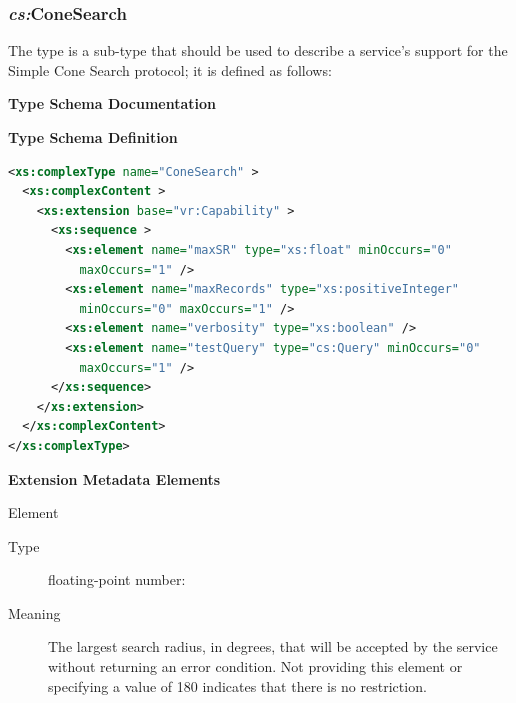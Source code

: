 \documentclass[11pt,a4paper]{ivoa}
\begin{document}
\subsubsection{\textit{cs:}ConeSearch}
\label{subsec:cstype}
The  type is a  sub-type that should be used
to describe a service's support for the Simple Cone Search protocol;
it is defined as follows:

\begin{generated}
\begingroup
      	\renewcommand*\descriptionlabel[1]{%
      	\hbox to 5.5em{\emph{#1}\hfil}}\vspace{2ex}\noindent\textbf{ Type Schema Documentation}


\vspace{1ex}\noindent\textbf{ Type Schema Definition}

\begin{lstlisting}[language=XML,basicstyle=\footnotesize]
<xs:complexType name="ConeSearch" >
  <xs:complexContent >
    <xs:extension base="vr:Capability" >
      <xs:sequence >
        <xs:element name="maxSR" type="xs:float" minOccurs="0" 
          maxOccurs="1" />
        <xs:element name="maxRecords" type="xs:positiveInteger" 
          minOccurs="0" maxOccurs="1" />
        <xs:element name="verbosity" type="xs:boolean" />
        <xs:element name="testQuery" type="cs:Query" minOccurs="0"
          maxOccurs="1" />
      </xs:sequence>
    </xs:extension>
  </xs:complexContent>
</xs:complexType>
\end{lstlisting}

\vspace{0.5ex}\noindent\textbf{ Extension Metadata Elements}

\begingroup\small\begin{bigdescription}\item[Element \xmlel{maxSR}]
\begin{description}
\item[Type] floating-point number: 
\item[Meaning] 
                        The largest search radius, in degrees, that will be
                        accepted by the service without returning an error 
                        condition.  Not providing this element or 
                        specifying a value of 180 indicates that there
                        is no restriction.
                     

\end{description}
\end{bigdescription}
\end{generated}
\end{document}
